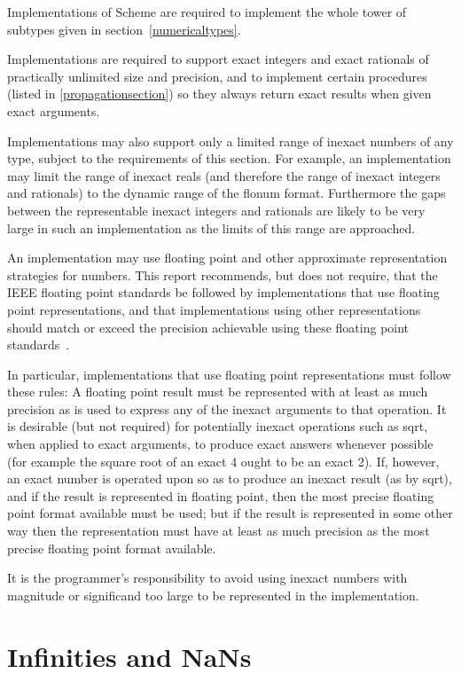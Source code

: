 \vest Implementations of Scheme are required to implement the whole
tower of subtypes given in section~\ref{numericaltypes}.

\vest Implementations are required to support
exact integers and exact rationals of
practically unlimited size and precision, and to implement
certain procedures (listed in \ref{propagationsection})
so they always return exact results when given exact
arguments.

\vest Implementations may also support only a limited range of
inexact numbers of
any type, subject to the requirements of this section.  For example,
an implementation may
limit the range of inexact reals (and therefore
the range of inexact integers and rationals)
to the dynamic range of the flonum format.
Furthermore
the gaps between the representable inexact integers and
rationals are
likely to be very large in such an implementation as the limits of this
range are approached.

\vest An implementation may use floating point and other approximate 
representation strategies for  numbers.
This report recommends, but does not require, that the IEEE 
floating point standards be followed by implementations that use
floating point representations, and that implementations using
other representations should match or exceed the precision achievable
using these floating point standards~\cite{IEEE}.

\vest In particular, implementations that use floating point
representations must follow these rules: A floating point result
must be represented with at least as much precision as is
used to express any of the inexact arguments to that operation.
It is desirable (but not required) for
potentially inexact operations such as {\cf sqrt}, when applied to exact
arguments, to produce exact answers whenever possible (for example the
square root of an exact 4 ought to be an exact 2).
If, however, an
exact number is operated upon so as to produce an inexact result
(as by {\cf sqrt}), and if the result is represented in floating
point, then the most precise floating point format available
must be used; but if the result
is represented in some other way then the representation must have
at least as much precision as the most precise
floating point format available.

It is the programmer's responsibility to avoid using inexact numbers
with magnitude or significand too large to be represented in the
implementation.

\section{Infinities and NaNs}


